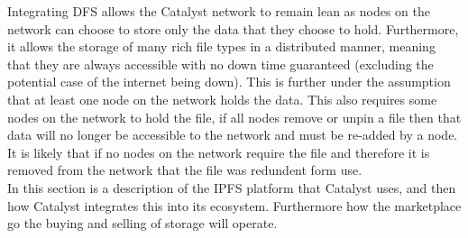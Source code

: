 Integrating DFS allows the Catalyst network to remain lean as nodes on the network can choose to store only the data that they choose to hold. Furthermore, it allows the storage of many rich file types in a distributed manner, meaning that they are always accessible with no down time guaranteed (excluding the potential case of the internet being down). This is further under the assumption that at least one node on the network holds the data. This also requires some nodes on the network to hold the file, if all nodes remove or unpin a file then that data will no longer be accessible to the network and must be re-added by a node. It is likely that if no nodes on the network require the file and therefore it is removed from the network that the file was redundent form use.\\ %



In this section is a description of the IPFS platform that Catalyst uses, and then how Catalyst integrates this into its ecosystem. Furthermore how the marketplace go the buying and selling of storage will operate. 